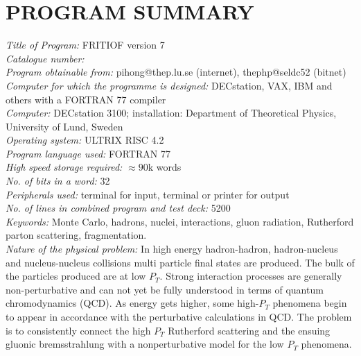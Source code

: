 \section*{PROGRAM SUMMARY}

\normalsize

{\it Title of Program:} FRITIOF version 7 \\

{\it Catalogue number:} \\

{\it Program obtainable from:} pihong@thep.lu.se (internet),
thephp@seldc52 (bitnet) \\

{\it Computer for which the programme is designed:} DECstation,
VAX, IBM and others with a FORTRAN 77 compiler \\

{\it Computer:} DECstation 3100; installation: Department of
Theoretical Physics, University of Lund, Sweden \\

{\it Operating system:} ULTRIX RISC 4.2 \\

{\it Program language used:} FORTRAN 77 \\

{\it High speed storage required:} $\approx 90$k words\\

{\it No. of bits in a word:} 32 \\

{\it Peripherals used:} terminal for input, terminal or printer
for output \\

{\it No. of lines in combined program and test deck:} 5200 \\

{\it Keywords:} Monte Carlo, hadrons, nuclei, interactions, gluon radiation,
                Rutherford parton scattering, fragmentation. \\

{\it Nature of the physical problem:} In high energy hadron-hadron, 
 hadron-nucleus and nucleus-nucleus collisions multi particle final states are
 produced.  The bulk of the particles produced are
 at low $P_T$.  Strong interaction processes are 
 generally non-perturbative and can not yet be fully understood  
 in terms of quantum chromodynamics (QCD).  As energy gets higher, 
 some high-$P_T$ phenomena begin to appear in accordance with the
 perturbative calculations in QCD.  
 The problem is to consistently connect the high $P_T$ Rutherford scattering
 and the ensuing gluonic bremsstrahlung with a nonperturbative model for the low  
 $P_T$ phenomena. \\
 \\

